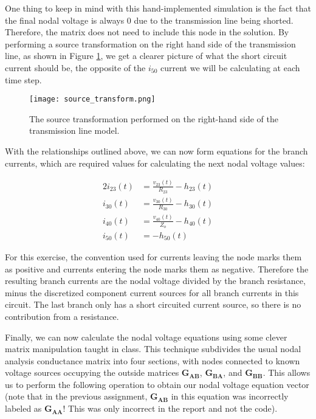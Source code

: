 \documentclass[10pt, oneside, letterpaper]{article}
\begin{document}
One thing to keep in mind with this hand-implemented simulation is the fact that the final nodal voltage is always 0 due to the transmission line being shorted. Therefore, the matrix does not need to include this node in the solution. By performing a source transformation on the right hand side of the transmission line, as shown in Figure \ref{source-transform}, we get a clearer picture of what the short circuit current should be, the opposite of the $i_{50}$ current we will be calculating at each time step.

\begin{figure}[H]
\centering
\texttt{[image: source\_transform.png]}
\caption{The source transformation performed on the right-hand side of the transmission line model.}
\label{source-transform}
\end{figure}

With the relationships outlined above, we can now form equations for the branch currents, which are required values for calculating the next nodal voltage values:

\begin{alignat}{2}
i_{23}(t) &= \frac{v_{23}(t)}{R_{23}} - h_{23}(t) \\
i_{30}(t) &= \frac{v_{30}(t)}{R_{30}} - h_{30}(t) \\
i_{40}(t) &= \frac{v_{40}(t)}{Z_o} - h_{40}(t) \\
i_{50}(t) &= - h_{50}(t)
\end{alignat}

For this exercise, the convention used for currents leaving the node marks them as positive and currents entering the node marks them as negative. Therefore the resulting branch currents are the nodal voltage divided by the branch resistance, minus the discretized component current sources for all branch currents in this circuit. The last branch only has a short circuited current source, so there is no contribution from a resistance.

Finally, we can now calculate the nodal voltage equations using some clever matrix manipulation taught in class. This technique subdivides the usual nodal analysis conductance matrix into four sections, with nodes connected to known voltage sources occupying the outside matrices $\mathbf{G_{AB}}$, $\mathbf{G_{BA}}$, and $\mathbf{G_{BB}}$. This allows us to perform the following operation to obtain our nodal voltage equation vector (note that in the previous assignment, $\mathbf{G_{AB}}$ in this equation was incorrectly labeled as $\mathbf{G_{AA}}$! This was only incorrect in the report and not the code).
\end{document}
